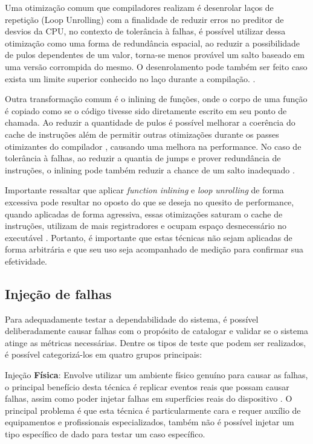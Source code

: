Uma otimização comum que compiladores realizam é desenrolar laços de repetição (Loop Unrolling) com a finalidade de reduzir erros no preditor de desvios da CPU, no contexto de tolerância à falhas, é possível utilizar dessa otimização como uma forma de redundância espacial, ao reduzir a possibilidade de pulos dependentes de um valor, torna-se menos provável um salto baseado em uma versão corrompida do mesmo. O desenrolamento pode também ser feito caso exista um limite superior conhecido no laço durante a compilação. \cite{LoopUnrollingARM}.

Outra transformação comum é o inlining de funções, onde o corpo de uma função é copiado como se o código tivesse sido diretamente escrito em seu ponto de chamada. Ao reduzir a quantidade de pulos é possível melhorar a coerência do cache de instruções além de permitir outras otimizações durante os passes otimizantes do compilador \cite{EngineeringACompiler}, causando uma melhora na performance. No caso de tolerância à falhas, ao reduzir a quantia de jumps e prover redundância de instruções, o inlining pode também reduzir a chance de um salto inadequado \cite{MakingReliableDistSystems}. %

Importante ressaltar que aplicar \textit{function inlining} e \textit{loop unrolling} de forma excessiva pode resultar no oposto do que se deseja no quesito de performance, quando aplicadas de forma agressiva, essas otimizações saturam o cache de instruções, utilizam de mais registradores e ocupam espaço desnecessário no executável \cite{EngineeringACompiler}. Portanto, é importante que estas técnicas não sejam aplicadas de forma arbitrária e que seu uso seja acompanhado de medição para confirmar sua efetividade.

\subsection{Injeção de falhas}

Para adequadamente testar a dependabilidade do sistema, é possível deliberadamente causar falhas com o propósito de catalogar e validar se o sistema atinge as métricas necessárias. Dentre os tipos de teste que podem ser realizados, é possível categorizá-los em quatro grupos principais:

Injeção \textbf{Física}: Envolve utilizar um ambiente físico genuíno para causar as falhas, o principal benefício desta técnica é replicar eventos reais que possam causar falhas, assim como poder injetar falhas em superfícies reais do dispositivo \cite{FaultInjectionTechniques}. O principal problema é que esta técnica é particularmente cara e requer auxílio de equipamentos e profissionais especializados, também não é possível injetar um tipo específico de dado para testar um caso específico.

